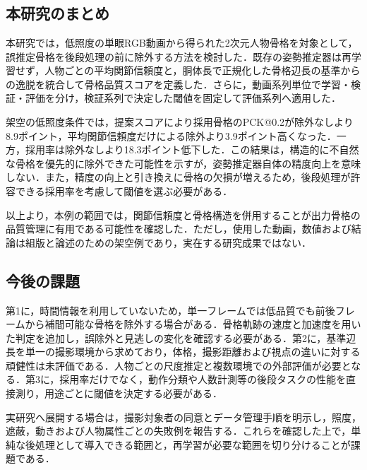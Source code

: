 \chapter{\UsamiConclusionTitle}

\begin{center}
  \UsamiFictionalExampleNotice
\end{center}

\section{本研究のまとめ}

本研究では，低照度の単眼RGB動画から得られた2次元人物骨格を対象として，誤推定骨格を後段処理の前に除外する方法を検討した．既存の姿勢推定器は再学習せず，人物ごとの平均関節信頼度と，胴体長で正規化した骨格辺長の基準からの逸脱を統合して骨格品質スコアを定義した．さらに，動画系列単位で学習・検証・評価を分け，検証系列で決定した閾値を固定して評価系列へ適用した．

架空の低照度条件では，提案スコアにより採用骨格のPCK@0.2が除外なしより8.9ポイント，平均関節信頼度だけによる除外より3.9ポイント高くなった．一方，採用率は除外なしより18.3ポイント低下した．この結果は，構造的に不自然な骨格を優先的に除外できた可能性を示すが，姿勢推定器自体の精度向上を意味しない．また，精度の向上と引き換えに骨格の欠損が増えるため，後段処理が許容できる採用率を考慮して閾値を選ぶ必要がある．

以上より，本例の範囲では，関節信頼度と骨格構造を併用することが出力骨格の品質管理に有用である可能性を確認した．ただし，使用した動画，数値および結論は組版と論述のための架空例であり，実在する研究成果ではない．

\section{今後の課題}

第1に，時間情報を利用していないため，単一フレームでは低品質でも前後フレームから補間可能な骨格を除外する場合がある．骨格軌跡の速度と加速度を用いた判定を追加し，誤除外と見逃しの変化を確認する必要がある．第2に，基準辺長を単一の撮影環境から求めており，体格，撮影距離および視点の違いに対する頑健性は未評価である．人物ごとの尺度推定と複数環境での外部評価が必要となる．第3に，採用率だけでなく，動作分類や人数計測等の後段タスクの性能を直接測り，用途ごとに閾値を決定する必要がある．

実研究へ展開する場合は，撮影対象者の同意とデータ管理手順を明示し，照度，遮蔽，動きおよび人物属性ごとの失敗例を報告する．これらを確認した上で，単純な後処理として導入できる範囲と，再学習が必要な範囲を切り分けることが課題である．
